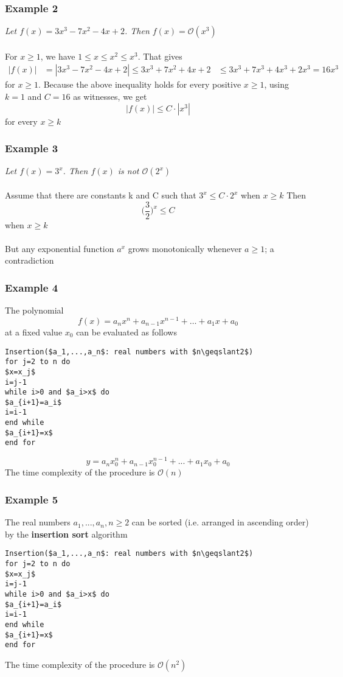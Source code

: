 \documentclass{article}[18pt]
\begin{document}
\subsubsection{Example 2}
\textit{Let $f(x)=3x^3-7x^2-4x+2$. Then $f(x)=\mathcal{O}(x^3)$ }\\
\\
For $x\geqslant 1$, we have $1\leqslant x\leqslant x^2\leqslant x^3$. That gives
$$\begin{aligned} | f ( x ) | & = \left| 3 x ^ { 3 } - 7 x ^ { 2 } - 4 x + 2 \right| \leq 3 x ^ { 3 } + 7 x ^ { 2 } + 4 x + 2 & \leq 3 x ^ { 3 } + 7 x ^ { 3 } + 4 x ^ { 3 } + 2 x ^ { 3 } = 16 x ^ { 3 } \end{aligned}$$
for $x\geqslant 1$. Because the above inequality holds for every positive $x\geqslant 1$, using $k=1$ and $C=16$ as witnesses, we get
$$|f(x)|\leqslant C\cdot |x^3|$$
for every $x\geqslant k$
\subsubsection{Example 3}
\textit{Let $f(x)=3^x$. Then $f(x)$ is not $\mathcal{O}(2^x)$}\\
\\
Assume that there are constants k and C such that $3^x\leqslant C\cdot 2^x$ when $x\geqslant k$ Then
$$\Bigg(\dfrac{3}{2}\Bigg)^x\leqslant C$$
when $x\geqslant k$\\
\\
But any exponential function $a^x$ grows monotonically whenever $a\geqslant 1$; a contradiction
\subsubsection{Example 4}
The polynomial
$$f ( x ) = a _ { n } x ^ { n } + a _ { n - 1 } x ^ { n - 1 } + \ldots + a _ { 1 } x + a _ { 0 }$$
at a fixed value $x_0$ can be evaluated as follows

\begin{lstlisting}
Insertion($a_1,...,a_n$: real numbers with $n\geqslant2$)
for j=2 to n do
$x=x_j$
i=j-1
while i>0 and $a_i>x$ do
$a_{i+1}=a_i$
i=i-1
end while
$a_{i+1}=x$
end for
\end{lstlisting}
$$y=a_nx_0^n+a_{n-1}x_0^{n-1}+...+a_1x_0+a_0$$
The time complexity of the procedure is $\mathcal{O}(n)$
\subsubsection{Example 5}
The real numbers $a_1,...,a_n, n\geqslant 2$ can be sorted (i.e. arranged in ascending order) by the \textbf{insertion sort} algorithm
\begin{lstlisting}
Insertion($a_1,...,a_n$: real numbers with $n\geqslant2$)
for j=2 to n do
$x=x_j$
i=j-1
while i>0 and $a_i>x$ do
$a_{i+1}=a_i$
i=i-1
end while
$a_{i+1}=x$
end for
\end{lstlisting}
The time complexity of the procedure is $\mathcal{O}(n^2)$
\end{document}
